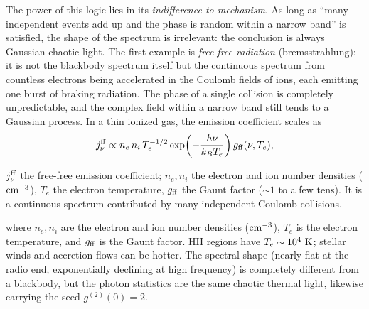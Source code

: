 The power of this logic lies in its \emph{indifference to mechanism}. As long as ``many independent events add up and the phase is random within a narrow band'' is satisfied, the shape of the spectrum is irrelevant: the conclusion is always Gaussian chaotic light. The first example is \emph{free-free radiation} (bremsstrahlung): it is not the blackbody spectrum itself but the continuous spectrum from countless electrons being accelerated in the Coulomb fields of ions, each emitting one burst of braking radiation. The phase of a single collision is completely unpredictable, and the complex field within a narrow band still tends to a Gaussian process. In a thin ionized gas, the emission coefficient scales as
\begin{equation}
  j_\nu^{\rm ff}\propto
  n_e\,n_i\,T_e^{-1/2}
  \exp\!\left(-\frac{h\nu}{k_BT_e}\right)
  g_{\rm ff}(\nu,T_e),
  \label{eq:e16-free-free}
\end{equation}
\begin{formulaexplain}
\(j_\nu^{\rm ff}\) the free-free emission coefficient; \(n_e,n_i\) the electron and ion number densities (\({\rm cm^{-3}}\)), \(T_e\) the electron temperature, \(g_{\rm ff}\) the Gaunt factor (\(\sim1\) to a few tens). It is a continuous spectrum contributed by many independent Coulomb collisions.
\end{formulaexplain}
where \(n_e,n_i\) are the electron and ion number densities (\({\rm cm^{-3}}\)), \(T_e\) is the electron temperature, and \(g_{\rm ff}\) is the Gaunt factor. HII regions have \(T_e\sim10^4~{\rm K}\); stellar winds and accretion flows can be hotter. The spectral shape (nearly flat at the radio end, exponentially declining at high frequency) is completely different from a blackbody, but the photon statistics are the same chaotic thermal light, likewise carrying the seed \(g^{(2)}(0)=2\).


